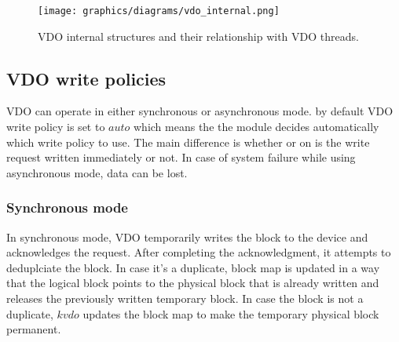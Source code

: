 \documentclass[
  color, %
  table, %
  lof,   %
  lot,   %
]{fithesis3}
\begin{document}
\addtolength{\textheight}{1.75in}
\begin{landscape}
\begin{figure}[!hb]
        \centering
        \texttt{[image: graphics/diagrams/vdo\_internal.png]}
\caption[VDO threads and internal structures]{VDO internal structures and their relationship with VDO threads.}
\label{fig:VDO-internals}
\end{figure}
\end{landscape}
\addtolength{\textheight}{-1.75in}



\subsection{VDO write policies}
VDO can operate in either synchronous or asynchronous mode.\cite{man:writemodes} by default VDO write policy is set to $auto$ which means the the module decides automatically which write policy to use. The main difference is whether or on is the write request written immediately or not. In case of system failure while using asynchronous mode, data can be lost.

\subsubsection{Synchronous mode}
In synchronous mode, VDO temporarily writes the block to the device and acknowledges the request. After completing the acknowledgment, it attempts to deduplciate the block. In case it's a duplicate, block map is updated in a way that the logical block points to the physical block that is already written and releases the previously written temporary block. In case the block is not a duplicate, $kvdo$ updates the block map to make the temporary physical block permanent.
\end{document}
